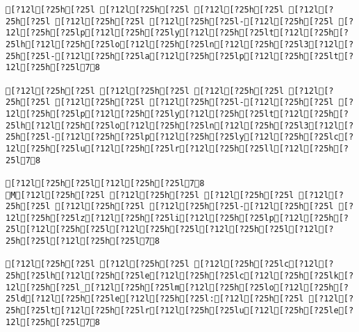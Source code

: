 \documentclass{scrartcl}
\begin{document}
\begin{Verbatim}
[?12l[?25h[?25l [?12l[?25h[?25l [?12l[?25h[?25l [?12l[?25h[?25l [?12l[?25h[?25l [?12l[?25h[?25l-[?12l[?25h[?25l [?12l[?25h[?25lp[?12l[?25h[?25ly[?12l[?25h[?25lt[?12l[?25h[?25lh[?12l[?25h[?25lo[?12l[?25h[?25ln[?12l[?25h[?25l3[?12l[?25h[?25l-[?12l[?25h[?25la[?12l[?25h[?25lp[?12l[?25h[?25lt[?12l[?25h[?25l78

[?12l[?25h[?25l [?12l[?25h[?25l [?12l[?25h[?25l [?12l[?25h[?25l [?12l[?25h[?25l [?12l[?25h[?25l-[?12l[?25h[?25l [?12l[?25h[?25lp[?12l[?25h[?25ly[?12l[?25h[?25lt[?12l[?25h[?25lh[?12l[?25h[?25lo[?12l[?25h[?25ln[?12l[?25h[?25l3[?12l[?25h[?25l-[?12l[?25h[?25lp[?12l[?25h[?25ly[?12l[?25h[?25lc[?12l[?25h[?25lu[?12l[?25h[?25lr[?12l[?25h[?25ll[?12l[?25h[?25l78

[?12l[?25h[?25l[?12l[?25h[?25l78
M[?12l[?25h[?25l [?12l[?25h[?25l [?12l[?25h[?25l [?12l[?25h[?25l [?12l[?25h[?25l [?12l[?25h[?25l-[?12l[?25h[?25l [?12l[?25h[?25lz[?12l[?25h[?25li[?12l[?25h[?25lp[?12l[?25h[?25l[?12l[?25h[?25l[?12l[?25h[?25l[?12l[?25h[?25l[?12l[?25h[?25l[?12l[?25h[?25l78

[?12l[?25h[?25l [?12l[?25h[?25l [?12l[?25h[?25lc[?12l[?25h[?25lh[?12l[?25h[?25le[?12l[?25h[?25lc[?12l[?25h[?25lk[?12l[?25h[?25l_[?12l[?25h[?25lm[?12l[?25h[?25lo[?12l[?25h[?25ld[?12l[?25h[?25le[?12l[?25h[?25l:[?12l[?25h[?25l [?12l[?25h[?25lt[?12l[?25h[?25lr[?12l[?25h[?25lu[?12l[?25h[?25le[?12l[?25h[?25l78


\end{Verbatim}
\end{document}
